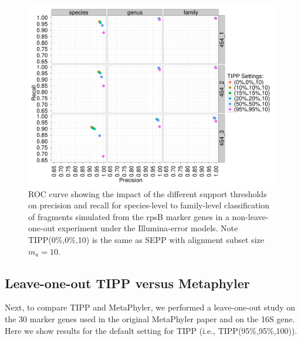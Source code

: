 \begin{figure}[htpb]
\begin{center}
\includegraphics[scale=0.40]{higher_error/roc_higher_error_illumina_all_1_5_12}
\end{center}
\caption[ROC curve for TIPP on rpsB data]{\label{tipp:roc_curve_full}ROC curve showing the
  impact of the different support thresholds on precision and recall
  for species-level to family-level classification of
  fragments simulated from the rpsB marker genes in a
  non-leave-one-out experiment under the Illumina-error models. 
Note TIPP(0\%,0\%,10) is the same as 
SEPP with alignment subset size $m_a=10$.
}
\end{figure}

\newpage
\subsection{Leave-one-out TIPP versus Metaphyler}  
Next, to compare TIPP and MetaPhyler, we performed a
leave-one-out study  on the 
30 marker genes used in the original MetaPhyler paper and
on the 16S gene.
Here we show results for the default setting for TIPP (i.e., TIPP(95\%,95\%,100)).

